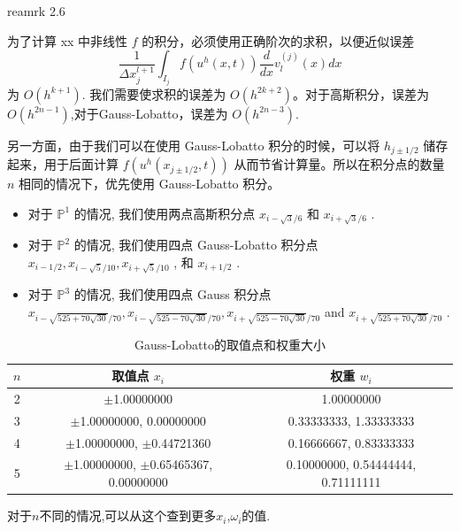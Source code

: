 \documentclass{book}
\begin{document}
\cite{RKDG2} reamrk 2.6


为了计算 xx 中非线性 $f$ 的积分，必须使用正确阶次的求积，以便近似误差
\begin{equation}
    \frac{1}{\Delta x_{j}^{l+1}} \int_{I_{j}} f\left(u^{h}(x, t)\right) \frac{d}{d x} v_{l}^{(j)}(x) d x
\end{equation}
为 $O\left(h^{k+1}\right)$. 我们需要使求积的误差为 $O\left(h^{2 k+2}\right)$。对于高斯积分，误差为 $O\left(h^{2n-1}\right)$,对于Gauss-Lobatto，误差为 $O\left(h^{2n-3}\right)$.

另一方面，由于我们可以在使用 Gauss-Lobatto 积分的时候，可以将 $h_{j \pm 1 / 2}$  储存起来，用于后面计算  $f\left(u^{h}\left(x_{j \pm 1 / 2}, t\right)\right)$ 从而节省计算量。所以在积分点的数量 $n$ 相同的情况下，优先使用  Gauss-Lobatto 积分。

\begin{itemize}
    \item 对于  $\mathbb{P}^{1}$  的情况, 我们使用两点高斯积分点  $x_{i-\sqrt{3} / 6}$  和  $x_{i+\sqrt{3} / 6}$ .
    \item 对于  $\mathbb{P}^{2}$  的情况, 我们使用四点 Gauss-Lobatto 积分点  $x_{i-1 / 2}, x_{i-\sqrt{5} / 10}, x_{i+\sqrt{5} / 10}$ , 和  $x_{i+1 / 2}$ .
    \item 对于  $\mathbb{P}^{3}$  的情况, 我们使用四点 Gauss 积分点  $x_{i-\sqrt{525+70 \sqrt{30}} / 70}, x_{i-\sqrt{525-70 \sqrt{30}} / 70}, x_{i+\sqrt{525-70 \sqrt{30}} / 70}$  and  $x_{i+\sqrt{525+70 \sqrt{30}} / 70}$ .
\end{itemize}

\begin{table}[ht]
    \centering
    \caption{Gauss-Lobatto的取值点和权重大小}
    \label{tab:Gauss-Lobatto积分}
    \begin{tabular}{ccc}
        \toprule
        $n$ & 取值点 $x_i$                                 & 权重 $w_i$                         \\
        \midrule
        2   & $\pm$1.00000000                              & 1.00000000                         \\
        3   & $\pm$1.00000000, 0.00000000                  & 0.33333333, 1.33333333             \\
        4   & $\pm$1.00000000, $\pm$0.44721360             & 0.16666667, 0.83333333             \\
        5   & $\pm$1.00000000, $\pm$0.65465367, 0.00000000 & 0.10000000, 0.54444444, 0.71111111 \\
        \bottomrule
    \end{tabular}
\end{table}
对于$n$不同的情况,可以从这个\cite{RN106}查到更多$x_i$,$\omega_i$的值.
\end{document}
